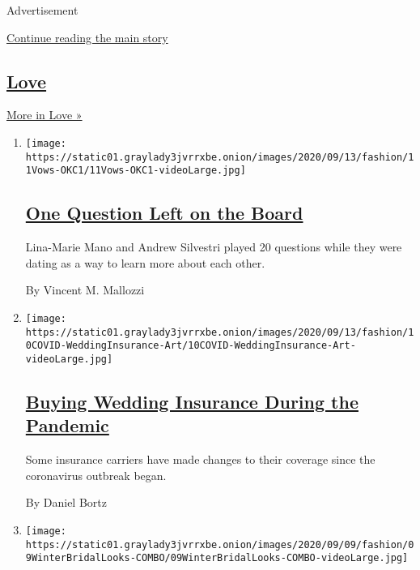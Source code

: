 Advertisement

\protect\hyperlink{after-mid1}{Continue reading the main story}

\hypertarget{love}{%
\subsection{\texorpdfstring{\href{/section/fashion/weddings}{Love}}{Love}}\label{love}}

\href{/section/fashion/weddings}{More in Love »}

\begin{enumerate}
\def\labelenumi{\arabic{enumi}.}
\item
  \texttt{[image: https://static01.graylady3jvrrxbe.onion/images/2020/09/13/fashion/11Vows-OKC1/11Vows-OKC1-videoLarge.jpg]}

  \hypertarget{one-question-left-on-the-board}{%
  \subsection{\texorpdfstring{\href{/2020/09/11/style/one-question-left-on-the-board.html}{One
  Question Left on the
  Board}}{One Question Left on the Board}}\label{one-question-left-on-the-board}}

  Lina-Marie Mano and Andrew Silvestri played 20 questions while they
  were dating as a way to learn more about each other.

  By Vincent M. Mallozzi
\item
  \texttt{[image: https://static01.graylady3jvrrxbe.onion/images/2020/09/13/fashion/10COVID-WeddingInsurance-Art/10COVID-WeddingInsurance-Art-videoLarge.jpg]}

  \hypertarget{buying-wedding-insurance-during-the-pandemic-1}{%
  \subsection{\texorpdfstring{\href{/2020/09/10/fashion/weddings/buying-wedding-insurance-during-covid-pandemic.html}{Buying
  Wedding Insurance During the
  Pandemic}}{Buying Wedding Insurance During the Pandemic}}\label{buying-wedding-insurance-during-the-pandemic-1}}

  Some insurance carriers have made changes to their coverage since the
  coronavirus outbreak began.

  By Daniel Bortz
\item
  \texttt{[image: https://static01.graylady3jvrrxbe.onion/images/2020/09/09/fashion/09WinterBridalLooks-COMBO/09WinterBridalLooks-COMBO-videoLarge.jpg]}


\end{enumerate}
